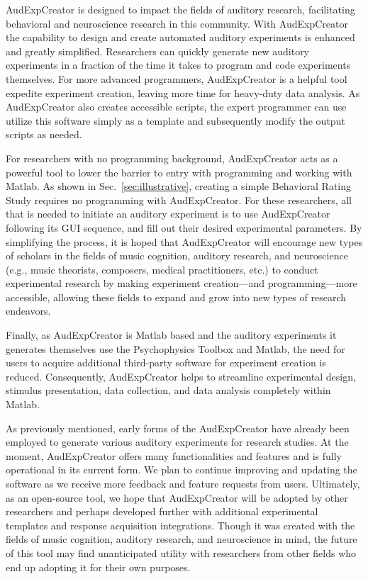 \documentclass[preprint,12pt, a4paper]{elsarticle}
\begin{document}
AudExpCreator is designed to impact the fields of auditory research, facilitating behavioral and neuroscience research in this community. With AudExpCreator the capability to design and create automated auditory experiments is enhanced and greatly simplified. Researchers can quickly generate new auditory experiments in a fraction of the time it takes to program and code experiments themselves. For more advanced programmers, AudExpCreator is a helpful tool expedite experiment creation, leaving more time for heavy-duty data analysis. As AudExpCreator also creates accessible scripts, the expert programmer can use utilize this software simply as a template and subsequently modify the output scripts as needed. 

For researchers with no programming background, AudExpCreator acts as a powerful tool to lower the barrier to entry with programming and working with Matlab. As shown in Sec.~\ref{sec:illustrative}, creating a simple Behavioral Rating Study requires no programming with AudExpCreator. For these researchers, all that is needed to initiate an auditory experiment is to use AudExpCreator following its GUI sequence, and fill out their desired experimental parameters. By simplifying the process, it is hoped that AudExpCreator will encourage new types of scholars in the fields of music cognition, auditory research, and neuroscience (e.g., music theorists, composers, medical practitioners, etc.) to conduct experimental research by making experiment creation---and programming---more accessible, allowing these fields to expand and grow into new types of research endeavors. 

Finally, as AudExpCreator is Matlab based and the auditory experiments it generates themselves use the Psychophysics Toolbox and Matlab, the need for users to acquire additional third-party software for experiment creation is reduced. Consequently, AudExpCreator helps to streamline experimental design, stimulus presentation, data collection, and data analysis completely within Matlab.

As previously mentioned, early forms of the AudExpCreator have already been employed to generate various auditory experiments for research studies. At the moment, AudExpCreator offers many functionalities and features and is fully operational in its current form. We plan to continue improving and updating the software as we receive more feedback and feature requests from users. Ultimately, as an open-source tool, we hope that AudExpCreator will be adopted by other researchers and perhaps developed further with additional experimental templates and response acquisition integrations. Though it was created with the fields of music cognition, auditory research, and neuroscience in mind, the future of this tool may find unanticipated utility with researchers from other fields who end up adopting it for their own purposes.  
\end{document}
